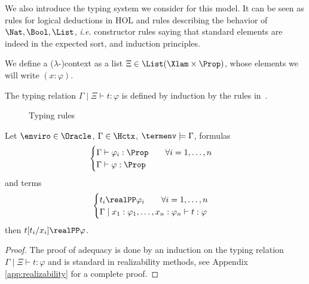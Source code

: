 
We also introduce the typing system we consider for this model. It can be seen as rules for logical deductions in HOL and rules describing the behavior of $\Nat,\Bool,\List$, \textit{i.e.} constructor rules saying that standard elements are indeed in the expected sort, and induction principles.

\begin{definition}
  We define a ($\lambda$-)context as a list $\Xi \in \List(\Xlam \times \Prop)$, whose elements we will write $(x : \varphi)$.

  The typing relation $\Gamma\mid \Xi \vdash t : \varphi$ is defined by induction by the rules in~.

\end{definition}
\begin{figure}[t]
 
 \caption{Typing rules}
 \label{fig:typing_rules}
\end{figure}

\begin{theorem}[Adequacy]\label{thm:adequacy}
  Let $\enviro \in \Oracle$, $\Gamma \in \Hctx$, $\termenv \models \Gamma$, formulas
  \[\begin{cases}
  \Gamma\vdash \varphi_i : \Prop \qquad \forall i = 1,\ldots,n\\
  \Gamma\vdash \varphi : \Prop
  \end{cases}\]
  and terms
  \[\begin{cases}
  t_i \realPP \varphi_i \qquad \forall i = 1,\ldots,n\\
  \Gamma \mid x_1 : \varphi_1,\ldots,x_n : \varphi_n \vdash t : \varphi
  \end{cases}\]
  then $t[t_i/x_i] \realPP \varphi$.
\end{theorem}
\begin{proof}
 The proof of adequacy is done by an induction on the typing relation $\Gamma\mid \Xi\vdash t : \varphi$ and is standard in realizability methods, see Appendix \ref{app:realizability} for a complete proof.
 \end{proof}

